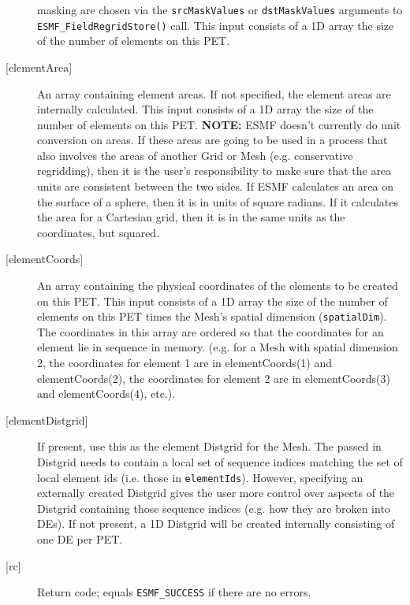\begin{description}
            masking are chosen via the {\tt srcMaskValues} or {\tt dstMaskValues} arguments to
            {\tt ESMF\_FieldRegridStore()} call. This input consists of a 1D array the
            size of the number of elements on this PET.
     \item [{[elementArea]}]
            An array containing element areas. If not specified, the element areas are internally calculated.
            This input consists of a 1D array the size of the number of elements on this PET.
            {\bf NOTE:} ESMF doesn't currently do unit conversion on areas. If these areas are going to be used
                  in a process that also involves the areas of another Grid or Mesh (e.g. conservative regridding), then
                  it is the user's responsibility to make sure that the area units are consistent between the two sides.
                  If ESMF calculates an area on the surface of a sphere, then it is in units of square radians. If
                  it calculates the area for a Cartesian grid, then it is in the same units as the coordinates, but squared.
     \item[{[elementCoords]}]
            An array containing the physical coordinates of the elements to be created on this
            PET. This input consists of a 1D array the size of the number of elements on this PET times the Mesh's
            spatial dimension ({\tt spatialDim}). The coordinates in this array are ordered
            so that the coordinates for an element lie in sequence in memory. (e.g. for a
            Mesh with spatial dimension 2, the coordinates for element 1 are in elementCoords(1) and
            elementCoords(2), the coordinates for element 2 are in elementCoords(3) and elementCoords(4),
            etc.).
     \item [{[elementDistgrid]}]
            If present, use this as the element Distgrid for the Mesh.
            The passed in Distgrid
            needs to contain a local set of sequence indices matching the set of local element ids (i.e. those in {\tt elementIds}).
            However, specifying an externally created Distgrid gives the user more control over aspects of
            the Distgrid containing those sequence indices (e.g. how they are broken into DEs).
            If not present, a 1D Distgrid will be created internally consisting of one DE per PET.
     \item [{[rc]}]
           Return code; equals {\tt ESMF\_SUCCESS} if there are no errors.
     \end{description}
   
